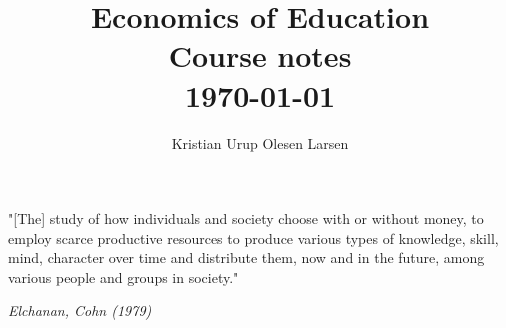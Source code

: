 \documentclass[12pt, a4paper]{article}
\begin{document}



\title{ Economics of Education  \\ \Large Course notes \\ \normalsize \today \\
}
\author{\normalsize Kristian Urup Olesen Larsen}
\date{} %
\maketitle %
\setcounter{page}{1} %



\epigraph{"[The] study of how individuals and society choose
with or without money,
to employ scarce productive resources
to produce various types of knowledge, skill, mind, character
over time
and distribute them, now and in the future,
among various people and groups in society."}{\textit{Elchanan, Cohn (1979)}}
\tableofcontents
\pagebreak
\end{document}

